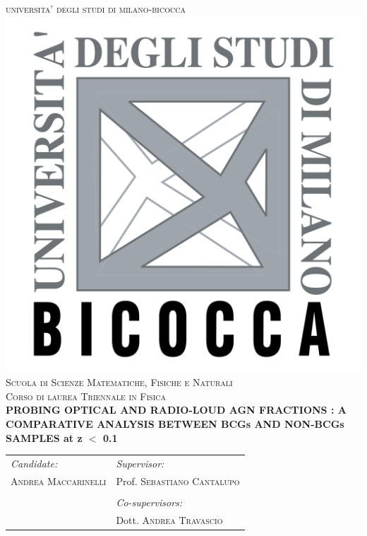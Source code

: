 

\newcommand{\HRule}{\rule{\linewidth}{0.5mm}} %



\begin{titlepage}



\center %
 
{ 
\textsc{\LARGE universita' degli studi di milano-bicocca}\\[1cm] %
}
\includegraphics[width = .25\textwidth]{logo_unimib.png}\\[1cm] %
\textsc{\Large Scuola di Scienze Matematiche, Fisiche e Naturali }\\[0.25cm] %
\textsc{\large Corso di laurea Triennale in Fisica}\\[0.75cm] %


\vspace{1.5cm}
{ 
{\bfseries PROBING OPTICAL AND RADIO-LOUD AGN FRACTIONS : A COMPARATIVE ANALYSIS BETWEEN BCGs AND NON-BCGs SAMPLES at z $<$ 0.1 }\\[0.4cm] %
}
\vspace{3cm}
 
\begin{table}[htb!]
\centering
\begin{tabularx}{\textwidth}{X X}
\emph{Candidate:} & \emph{Supervisor:} \\
\textsc{Andrea Maccarinelli} & Prof. \textsc{Sebastiano Cantalupo}  \\
& \\
& \emph{Co-supervisors:} \\
& Dott. \textsc{Andrea Travascio} \\
\end{tabularx}
\end{table}


\end{titlepage}

